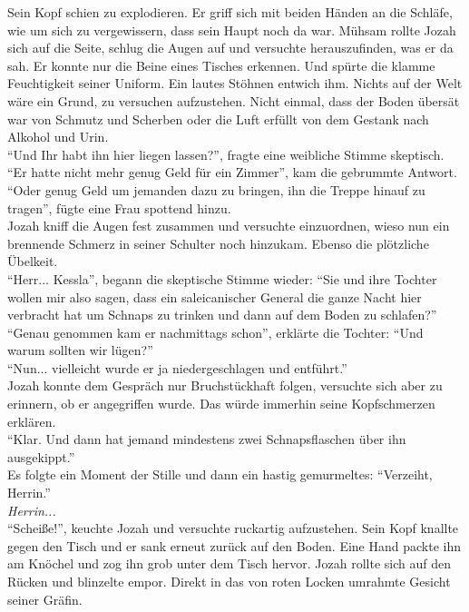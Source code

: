 Sein Kopf schien zu explodieren. Er griff sich mit beiden Händen an die Schläfe, wie um sich zu 
vergewissern, dass sein Haupt noch da war. Mühsam rollte Jozah sich auf die Seite, schlug die Augen 
auf und versuchte herauszufinden, was er da sah. Er konnte nur die Beine eines Tisches erkennen. 
Und spürte die klamme Feuchtigkeit seiner Uniform. Ein lautes Stöhnen entwich ihm. Nichts auf der 
Welt wäre ein Grund, zu versuchen aufzustehen. Nicht einmal, dass der Boden übersät war von 
Schmutz und Scherben oder die Luft erfüllt von dem Gestank nach Alkohol und Urin.\\
``Und Ihr habt ihn hier liegen lassen?'', fragte eine weibliche Stimme skeptisch.\\
``Er hatte nicht mehr genug Geld für ein Zimmer'', kam die gebrummte Antwort.\\
``Oder genug Geld um jemanden dazu zu bringen, ihn die Treppe hinauf zu tragen'', fügte 
eine Frau spottend hinzu.\\
Jozah kniff die Augen fest zusammen und versuchte einzuordnen, wieso nun ein brennende Schmerz in 
seiner Schulter noch hinzukam. Ebenso die plötzliche Übelkeit.\\
``Herr... Kessla'', begann die skeptische Stimme wieder: ``Sie und ihre Tochter wollen mir also 
sagen, dass ein saleicanischer General die ganze Nacht hier verbracht hat um Schnaps zu trinken und 
dann auf dem Boden zu schlafen?''\\
``Genau genommen kam er nachmittags schon'', erklärte die Tochter: ``Und warum sollten wir lügen?''\\
``Nun... vielleicht wurde er ja niedergeschlagen und entführt.''\\
Jozah konnte dem Gespräch nur Bruchstückhaft folgen, versuchte sich aber zu erinnern, ob er 
angegriffen wurde. Das würde immerhin seine Kopfschmerzen erklären.\\
``Klar. Und dann hat jemand mindestens zwei Schnapsflaschen über ihn ausgekippt.''\\
Es folgte ein Moment der Stille und dann ein hastig gemurmeltes: ``Verzeiht, Herrin.''\\
\textit{Herrin...}\\
``Scheiße!'', keuchte Jozah und versuchte ruckartig aufzustehen. Sein Kopf knallte gegen den Tisch 
und er sank erneut zurück auf den Boden. Eine Hand packte ihn am Knöchel und zog ihn grob unter dem 
Tisch hervor. Jozah rollte sich auf den Rücken und blinzelte empor. Direkt in das von roten Locken 
umrahmte Gesicht seiner Gräfin.\\
